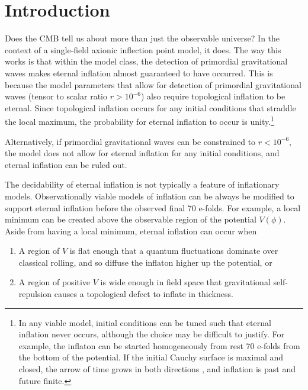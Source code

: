 \documentclass[aps,amsfonts,amsmath,prd,preprint,nofootinbib]{revtex4}
\begin{document}
\maketitle
\tableofcontents




\section{Introduction}


Does the CMB tell us about more than just the observable universe?  In the context of a single-field axionic inflection point model, it does.  
The way this works is that within the model class, the detection of primordial gravitational waves makes eternal inflation almost
guaranteed to have occurred.  This is because the model parameters that allow for detection of primordial gravitational waves (tensor to scalar ratio $r > 10^{-6}$) 
also require topological inflation to be eternal.  Since topological inflation occurs for any initial conditions that straddle the local maximum, the probability
for eternal inflation to occur is unity.\footnote{In any viable model, initial conditions can be tuned such that eternal inflation never occurs, although the choice may be 
difficult to justify.  For example, the inflaton can be started homogeneously from rest 70 e-folds from the bottom
of the potential.  If the initial Cauchy surface is maximal and closed, the arrow of time grows in both directions \cite{Aguirre:2007gy}, and inflation is 
past and future finite.}


Alternatively, if primordial gravitational waves can be constrained to $r < 10^{-6}$, the model does not allow for eternal inflation for any initial conditions,
and eternal inflation can be ruled out.  



The decidability of eternal inflation is not typically a feature of inflationary models.
 Observationally viable models of inflation can be always be modified to support eternal inflation before the observed final 70 e-folds.   
 For example, a local minimum can be created above the observable region of the potential $V(\phi)$.
 Aside from having a local minimum, eternal inflation can occur when
 \begin{enumerate}
 \item A region of $V$ is flat enough that a quantum fluctuations dominate over classical rolling, and so diffuse the inflaton higher up the potential, or
 \item A region of positive $V$ is wide enough in field space that gravitational self-repulsion causes a topological defect to inflate in thickness.
 \end{enumerate}
 
\end{document}
